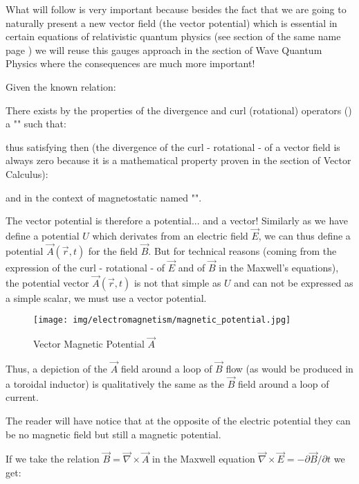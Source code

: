 	What will follow is very important because besides the fact that we are going to naturally present a new vector field (the vector potential) which is essential in certain equations of relativistic quantum physics (see section of the same name page \pageref{relativistic quantum physics}) we will reuse this gauges approach in the section of Wave Quantum Physics where the consequences are much more important!
	
	Given the known relation:
	
	There exists by the properties of the divergence and curl (rotational) operators () a "" such that:
	
	thus satisfying then (the divergence of the curl - rotational - of a vector field is always zero because it is a mathematical property proven in the section of Vector Calculus):
	
	and in the context of magnetostatic named "". 
	\begin{tcolorbox}[title=Remark,colframe=black,arc=10pt]
	The vector potential is therefore a potential... and a vector! Similarly as we have define a potential $U$ which derivates from an electric field $\vec{E}$, we can thus define a potential $\vec{A}(\vec{r},t)$ for the field $\vec{B}$. But for technical reasons (coming from the expression of the curl - rotational - of $\vec{E}$ and of $\vec{B}$ in the Maxwell's equations), the potential vector $\vec{A}(\vec{r},t)$ is not that simple as $U$ and can not be expressed as a simple scalar, we must use a vector potential.
	\end{tcolorbox}
	\begin{figure}[H]
		\centering
		\texttt{[image: img/electromagnetism/magnetic\_potential.jpg]}
		\caption{Vector Magnetic Potential $\vec{A}$}
	\end{figure}
	Thus, a depiction of the $\vec{A}$ field around a loop of $\vec{B}$ flow (as would be produced in a toroidal inductor) is qualitatively the same as the $\vec{B}$ field around a loop of current.
	
	The reader will have notice that at the opposite of the electric potential they can be no magnetic field but still a magnetic potential.
	
	If we take the relation $\vec{B}=\vec{\nabla}\times\vec{A}$ in the Maxwell equation $\vec{\nabla}\times\vec{E}=-\partial \vec{B}/\partial t$ we get:
	
